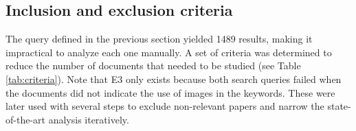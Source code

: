 
\subsection{Inclusion and exclusion criteria}\label{sec:gan_inclusion_exclusion}
The query defined in the previous section yielded 1489 results,  making it impractical to analyze each one manually. A set of criteria was determined to reduce the number of documents that needed to be studied (see Table \ref{tab:criteria}). Note that E3 only exists because both search queries failed when the documents did not indicate the use of images in the keywords. These were later used with several steps to exclude non-relevant papers and narrow the state-of-the-art analysis iteratively. 


